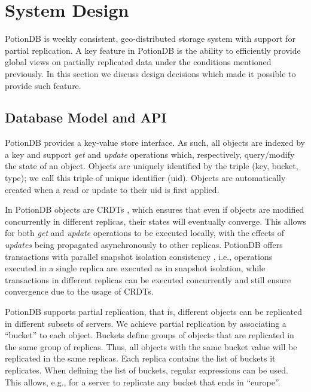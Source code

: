 \documentclass{vldb}
\newcommand{\grumbler}[2]{{\color{red}{\bf #1:} #2}}
\renewcommand{\grumbler}[2]{}
\newcommand{\andre}[1]{\grumbler{andre}{#1}}
\begin{document}
\section{System Design}

PotionDB is weekly consistent, geo-distributed storage system with support for partial replication.
A key feature in PotionDB is the ability to efficiently provide global views on partially replicated data under the conditions mentioned previously.
In this section we discuss design decisions which made it possible to provide such feature.

\subsection{Database Model and API}
\label{subsec:databasemodel}

%
%
%
%
%

PotionDB provides a key-value store interface.
As such, all objects are indexed by a key and support \emph{get} and \emph{update} operations which, respectively, query/modify the state of an object.
Objects are uniquely identified by the triple (key, bucket, type); we call this triple of unique identifier (uid).
Objects are automatically created when a read or update to their uid is first applied.

In PotionDB objects are CRDTs \cite{crdt}, which ensures that even if objects are modified concurrently in different replicas, their states will eventually converge.
This allows for both \emph{get} and \emph{update} operations to be executed locally, with the effects of \emph{updates} being propagated asynchronously to other replicas.
PotionDB offers transactions with parallel snapshot isolation consistency \cite{parallelSI}, i.e., operations executed in a single replica are executed as in snapshot isolation, while transactions in different replicas can be executed concurrently and still ensure convergence due to the usage of CRDTs.

PotionDB supports partial replication, that is, different objects can be replicated in different subsets of servers.
We achieve partial replication by associating a ``bucket'' to each object. Buckets define groups of objects that are replicated in the same group of replicas.
Thus, all objects with the same bucket value will be replicated in the same replicas.
Each replica contains the list of buckets it replicates.
When defining the list of buckets, regular expressions can be used.
This allows, e.g., for a server to replicate any bucket that ends in ``europe''.
\andre{We only support for buckets things like europe*, *europe, *europe*... basically suffixes and prefixes. How should I mention this?}
\end{document}
